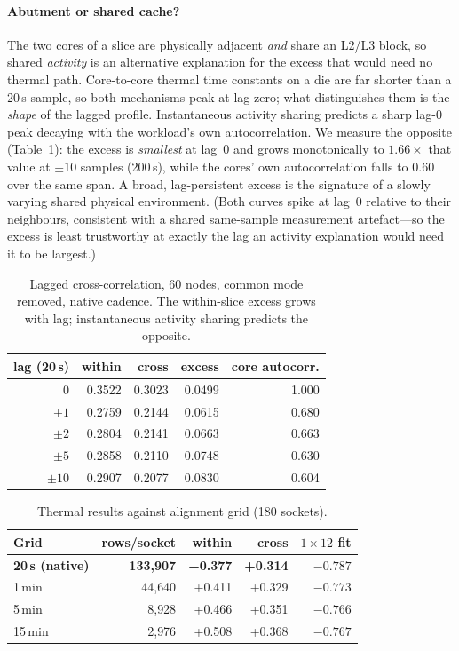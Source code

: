 \documentclass[10pt,conference]{IEEEtran}
\begin{document}
\paragraph*{Abutment or shared cache?} The two cores of a slice are physically adjacent
\emph{and} share an L2/L3 block, so shared \emph{activity} is an alternative explanation for the
excess that would need no thermal path. Core-to-core thermal time constants on a die are far
shorter than a 20\,s sample, so both mechanisms peak at lag zero; what distinguishes them is the
\emph{shape} of the lagged profile. Instantaneous activity sharing predicts a sharp lag-0 peak
decaying with the workload's own autocorrelation. We measure the opposite
(Table~\ref{tab:lag}): the excess is \emph{smallest} at lag~0 and grows monotonically to
$1.66\times$ that value at $\pm10$ samples (200\,s), while the cores' own autocorrelation falls to
0.60 over the same span. A broad, lag-persistent excess is the signature of a slowly varying shared
physical environment. (Both curves spike at lag~0 relative to their neighbours, consistent with a
shared same-sample measurement artefact---so the excess is least trustworthy at exactly the lag an
activity explanation would need it to be largest.)

\begin{table}[h]\centering\caption{Lagged cross-correlation, 60 nodes, common mode removed,
native cadence. The within-slice excess grows with lag; instantaneous activity sharing predicts the
opposite.}\label{tab:lag}\footnotesize
\begin{tabular}{rrrrr}\toprule
lag (20\,s) & within & cross & excess & core autocorr.\\\midrule
0 & 0.3522 & 0.3023 & 0.0499 & 1.000\\
$\pm1$ & 0.2759 & 0.2144 & 0.0615 & 0.680\\
$\pm2$ & 0.2804 & 0.2141 & 0.0663 & 0.663\\
$\pm5$ & 0.2858 & 0.2110 & 0.0748 & 0.630\\
$\pm10$ & 0.2907 & 0.2077 & 0.0830 & 0.604\\
\bottomrule\end{tabular}\end{table}

\begin{table}[h]\centering\caption{Thermal results against alignment grid (180 sockets).}
\label{tab:grid}\footnotesize
\begin{tabular}{lrrrr}\toprule
Grid & rows/socket & within & cross & $1\times12$ fit\\\midrule
\textbf{20\,s (native)} & \textbf{133{,}907} & \textbf{+0.377} & \textbf{+0.314} & \textbf{$-0.787$}\\
1\,min & 44{,}640 & +0.411 & +0.329 & $-0.773$\\
5\,min & 8{,}928 & +0.466 & +0.351 & $-0.766$\\
15\,min & 2{,}976 & +0.508 & +0.368 & $-0.767$\\
\bottomrule\end{tabular}\end{table}
\end{document}
